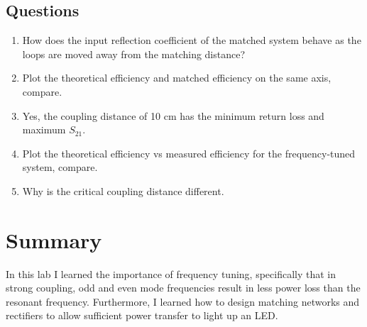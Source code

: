\documentclass{article}
\begin{document}
\subsection{Questions}

\begin{enumerate}
	\item How does the input reflection coefficient of the matched system behave as the loops are moved away from the matching distance?
	\item Plot the theoretical efficiency and matched efficiency on the same axis, compare.
	\item Yes, the coupling distance of 10 cm has the minimum return loss and maximum $S_{21}$.
	\item Plot the theoretical efficiency vs measured efficiency for the frequency-tuned system, compare.
	\item Why is the critical coupling distance different.
\end{enumerate}

\section{Summary}
In this lab I learned the importance of frequency tuning, specifically that in strong coupling, odd and even mode frequencies result in less power loss than the resonant frequency. Furthermore, I learned how to design matching networks and rectifiers to allow sufficient power transfer to light up an LED.
\end{document}
